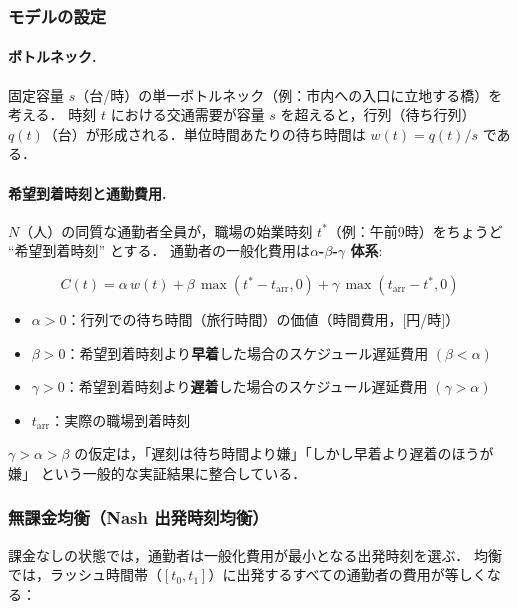 \subsubsection*{モデルの設定}

\paragraph*{ボトルネック.}
固定容量 $s$（台/時）の単一ボトルネック（例：市内への入口に立地する橋）を考える．
時刻 $t$ における交通需要が容量 $s$ を超えると，行列（待ち行列）
$q(t)$（台）が形成される．単位時間あたりの待ち時間は $w(t) = q(t)/s$ である．

\paragraph*{希望到着時刻と通勤費用.}
$N$（人）の同質な通勤者全員が，職場の始業時刻 $t^*$（例：午前9時）をちょうど ``希望到着時刻'' とする．
通勤者の一般化費用は\textbf{$\alpha$-$\beta$-$\gamma$ 体系}\cite{Small1982,ArnottdePalmaLindsey1990}:

\begin{equation}
  C(t)
  = \alpha\, w(t)
  + \beta\, \max(t^* - t_{\text{arr}}, 0)
  + \gamma\, \max(t_{\text{arr}} - t^*, 0)
  \label{eq:abc-cost}
\end{equation}

\begin{itemize}
  \item $\alpha > 0$：行列での待ち時間（旅行時間）の価値（時間費用，$[$円/時$]$）
  \item $\beta > 0$：希望到着時刻より\textbf{早着}した場合のスケジュール遅延費用 $(\beta < \alpha)$
  \item $\gamma > 0$：希望到着時刻より\textbf{遅着}した場合のスケジュール遅延費用 $(\gamma > \alpha)$
  \item $t_{\text{arr}}$：実際の職場到着時刻
\end{itemize}

$\gamma > \alpha > \beta$ の仮定は，「遅刻は待ち時間より嫌」「しかし早着より遅着のほうが嫌」
という一般的な実証結果に整合している．

\subsubsection*{無課金均衡（Nash 出発時刻均衡）}

課金なしの状態では，通勤者は一般化費用が最小となる出発時刻を選ぶ．
均衡では，ラッシュ時間帯（$[t_0, t_1]$）に出発するすべての通勤者の費用が等しくなる：

